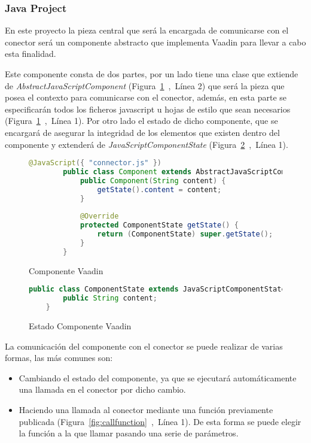  	
 	\subsubsection{Java Project}
 			
 	En este proyecto la pieza central que será la encargada de comunicarse con el conector será un componente abstracto que implementa Vaadin para llevar a cabo esta finalidad. 
 	
 	Este componente consta de dos partes, por un lado tiene una clase que extiende de \emph{AbstractJavaScriptComponent} (Figura~\ref{fig:componenteVaadin}~,~Línea 2) que será la pieza que posea el contexto para comunicarse con el conector, además, en esta parte se especificarán todos los ficheros javascript u hojas de estilo que sean necesarios (Figura~\ref{fig:componenteVaadin}~,~Línea 1). Por otro lado el estado de dicho componente, que se encargará de asegurar la integridad de los elementos que existen dentro del componente y extenderá de \emph{JavaScriptComponentState} (Figura~\ref{fig:estadoComponenteVaadin}~,~Línea 1).
 	
 	\begin{figure}[!tb]
 		\centering
 		\begin{lstlisting}[language=Java]
	 	@JavaScript({ "connector.js" })
	 	public class Component extends AbstractJavaScriptComponent {
		 	public Component(String content) {
		 		getState().content = content;
		 	}
		 	
		 	@Override
		 	protected ComponentState getState() {
		 		return (ComponentState) super.getState();
		 	}
	 	}
 		\end{lstlisting}
 		\caption{Componente Vaadin}
 		\label{fig:componenteVaadin}
 	\end{figure}
 
 
 \begin{figure}[!tb]
 	\centering
 	\begin{lstlisting}[language=Java]
	public class ComponentState extends JavaScriptComponentState {
		public String content;
	}
 	\end{lstlisting}
 	\caption{Estado Componente Vaadin}
 	\label{fig:estadoComponenteVaadin}
 \end{figure}


	La comunicación del componente con el conector se puede realizar de varias formas, las más comunes son:
	\begin{itemize}
		\item  Cambiando el estado del componente, ya que se ejecutará automáticamente una llamada en el conector por dicho cambio.
		\item  Haciendo una llamada al conector mediante una función previamente publicada (Figura~\ref{fig:callfunction}~,~Línea 1). De esta forma se puede elegir la función a la que llamar pasando una serie de parámetros.
	\end{itemize}

